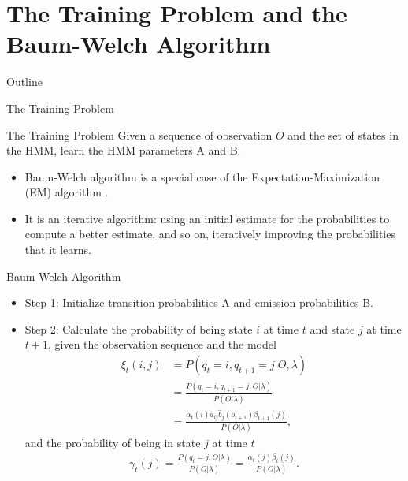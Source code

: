 \documentclass{beamer}
\begin{document}
\section{The Training Problem and the Baum-Welch Algorithm}
\begin{frame}{Outline}
	\tableofcontents[currentsection]
\end{frame}
\begin{frame}{The Training Problem }
	\begin{block}{The Training Problem}
		Given a sequence of observation $O$ and the set of states in the HMM, learn the HMM parameters A and B.
	\end{block}
	\begin{itemize}
		\item Baum-Welch algorithm is a special case of the Expectation-Maximization (EM) algorithm \cite{Jurafsky2009}.
		\item It is an iterative algorithm: using an initial estimate for the probabilities to compute a better estimate, and so on, iteratively improving the probabilities that it learns. 
	\end{itemize}
\end{frame}


\begin{frame}{Baum-Welch Algorithm}
	\begin{itemize}
	\item Step 1: Initialize transition probabilities A and emission probabilities B.
	\item Step 2: Calculate the probability of being state $i$ at time $t$ and state $j$ at time $t+1$, given the observation sequence and the model
	\begin{equation}
		\begin{split}
			\xi_t(i,j) & = P(q_t = i, q_{t+1} =j \vert O, \lambda) \\ 
			& =\frac{ P(q_t = i, q_{t+1} =j , O \vert \lambda)}{P(O\vert \lambda)} \\
			& = \frac{\alpha_t(i) \hat{a}_{ij}\hat{b}_j(o_{t+1}) \beta_{t+1}(j)}{P(O\vert \lambda)},
		\end{split}
	\end{equation}
	and the probability of being in state $j$ at time $t$
	\begin{equation}
		\begin{split}
			\gamma_t(j) = \frac{ P(q_t = j, O \vert \lambda)}{P(O\vert \lambda)} = \frac{\alpha_t(j)\beta_t(j)}{P(O\vert \lambda)}.
		\end{split}
	\end{equation}
	\end{itemize}
\end{frame}
\end{document}
